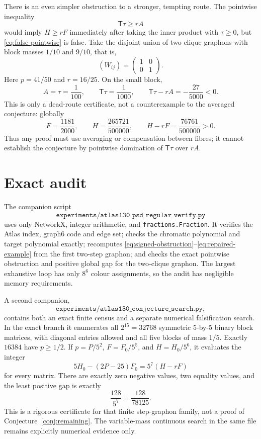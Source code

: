 \documentclass[11pt]{article}
\newcommand{\TT}{\mathsf T}
\begin{document}
There is an even simpler obstruction to a stronger, tempting route.  The
pointwise inequality
\begin{equation}
 \TT\tau\geq rA
 \label{eq:false-pointwise}
\end{equation}
would imply $H\geq rF$ immediately after taking the inner product with
$\tau\geq0$, but \eqref{eq:false-pointwise} is false.  Take the disjoint union
of two clique graphons with block masses $1/10$ and $9/10$, that is,
\[
 (W_{ij})=\begin{pmatrix}1&0\\0&1\end{pmatrix}.
\]
Here $p=41/50$ and $r=16/25$.  On the small block,
\[
 A=\tau=\frac1{100},\qquad
 \TT\tau=\frac1{1000},\qquad
 \TT\tau-rA=-\frac{27}{5000}<0.
\]
This is only a dead-route certificate, not a counterexample to the averaged
conjecture: globally
\[
 F=\frac{1181}{2000},\qquad
 H=\frac{265721}{500000},\qquad
 H-rF=\frac{76761}{500000}>0.
\]
Thus any proof must use averaging or compensation between fibres; it cannot
establish the conjecture by pointwise domination of $\TT\tau$ over $rA$.


\section{Exact audit}

The companion script
\[
 \texttt{experiments/atlas130\_psd\_regular\_verify.py}
\]
uses only NetworkX, integer arithmetic, and \texttt{fractions.Fraction}.
It verifies the Atlas index, graph6 code and edge set; checks the chromatic
polynomial and target polynomial exactly; recomputes
\eqref{eq:signed-obstruction}--\eqref{eq:repaired-example} from the first
two-step graphon; and checks the exact pointwise obstruction and positive
global gap for the two-clique graphon.  The largest exhaustive loop has only
$8^6$ colour assignments, so the audit has negligible memory requirements.

A second companion,
\[
 \texttt{experiments/atlas130\_conjecture\_search.py},
\]
contains both an exact finite census and a separate numerical falsification
search.  In the exact branch it enumerates all $2^{15}=32768$ symmetric
$5$-by-$5$ binary block matrices, with diagonal entries allowed and all five
blocks of mass $1/5$.  Exactly $16384$ have $p\geq1/2$.  If
$p=P/5^2$, $F=F_0/5^5$, and $H=H_0/5^6$, it evaluates the integer
\[
 5H_0-(2P-25)F_0=5^7(H-rF)
\]
for every matrix.  There are exactly zero negative values, two equality
values, and the least positive gap is exactly
\[
 \frac{128}{5^7}=\frac{128}{78125}.
\]
This is a rigorous certificate for that finite step-graphon family, not a
proof of Conjecture~\ref{conj:remaining}.  The variable-mass continuous search
in the same file remains explicitly numerical evidence only.
\end{document}
